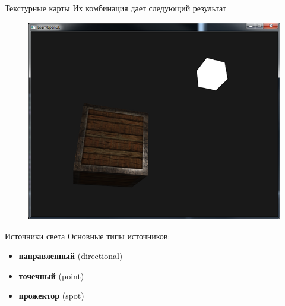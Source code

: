 \documentclass[aspectration=1610,t]{beamer}
\begin{document}
\begin{frame}[fragile]{Текстурные карты}
    Их комбинация дает следующий результат
    \begin{figure}[htp]
        \centering
        \includegraphics[scale=0.40]{res/diff_spec_combined}
    \end{figure}
\end{frame}

\begin{frame}[fragile]{Источники света}
    Основные типы источников:
    \begin{itemize}
        \item {\bf направленный} (directional)
        \item {\bf точечный} (point)
        \item {\bf прожектор} (spot)
    \end{itemize}
\end{frame}
\end{document}

